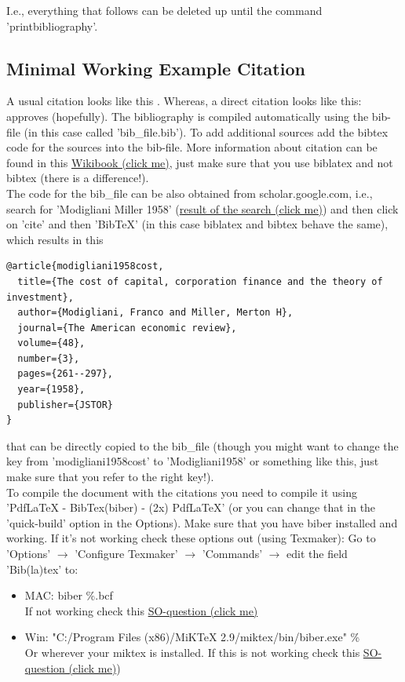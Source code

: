 \documentclass[12pt,a4paper]{article}
\begin{document}
I.e., everything that follows can be deleted up until the command 'printbibliography'.

\subsection{Minimal Working Example Citation}
A usual citation looks like this \parencite{R2016}. Whereas, a direct citation looks like this: \textcite{Hlavac2015} approves (hopefully). The bibliography is compiled automatically using the bib-file (in this case called 'bib\_file.bib'). To add additional sources add the bibtex code for the sources into the bib-file. More information about citation can be found in this \href{https://en.wikibooks.org/wiki/LaTeX/Bibliography_Management#biblatex}{Wikibook (click me)}, just make sure that you use biblatex and not bibtex (there is a difference!).\\

The code for the bib\_file can be also obtained from scholar.google.com, i.e., search for 'Modigliani Miller 1958' (\href{https://scholar.google.de/scholar?hl=en&q=modigliani+miller+1958&btnG=&as_sdt=1%2C5&as_sdtp=}{result of the search (click me)}) and then click on 'cite' and then 'BibTeX' (in this case biblatex and bibtex behave the same), which results in this 
\begin{verbatim}
@article{modigliani1958cost,
  title={The cost of capital, corporation finance and the theory of investment},
  author={Modigliani, Franco and Miller, Merton H},
  journal={The American economic review},
  volume={48},
  number={3},
  pages={261--297},
  year={1958},
  publisher={JSTOR}
}
\end{verbatim}

that can be directly copied to the bib\_file (though you might want to change the key from 'modigliani1958cost' to 'Modigliani1958' or something like this, just make sure that you refer to the right key!).\\

To compile the document with the citations you need to compile it using 'PdfLaTeX - BibTex(biber) - (2x) PdfLaTeX' (or you can change that in the 'quick-build' option in the Options). Make sure that you have biber installed and working. If it's not working check these options out (using Texmaker):
Go to 'Options' $\rightarrow$ 'Configure Texmaker' $\rightarrow$ 'Commands' $\rightarrow$ edit the field 'Bib(la)tex' to:
\begin{itemize}
\item MAC: biber \%.bcf \\
If not working check this \href{http://tex.stackexchange.com/questions/153359/setting-up-texmaker-on-mac-to-work-with-biber}{SO-question (click me)}
\item Win: "C:/Program Files (x86)/MiKTeX 2.9/miktex/bin/biber.exe" \%\\
Or wherever your miktex is installed. If this is not working check this \href{http://tex.stackexchange.com/questions/63039/install-biber-in-miktex-on-a-64-bit-version-of-windows}{SO-question (click me)})
\end{itemize}
\end{document}
